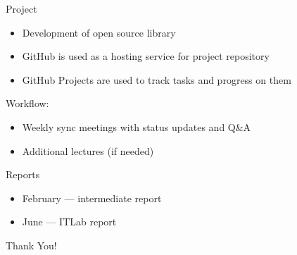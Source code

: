 \documentclass{beamer}
\begin{document}
\begin{frame}{Project}
  \begin{itemize}
    \item Development of open source library
    \item GitHub is used as a hosting service for project repository
    \item GitHub Projects are used to track tasks and progress on them
  \end{itemize}
  Workflow:
  \begin{itemize}
    \item Weekly sync meetings with status updates and Q\&A
    \item Additional lectures (if needed)
  \end{itemize}
\end{frame}

\begin{frame}{Reports}
  \begin{itemize}
    \item February --- intermediate report
    \item June --- ITLab report
  \end{itemize}
\end{frame}

\begin{frame}
    \centering
    \Huge{Thank You!}
\end{frame}
\end{document}
